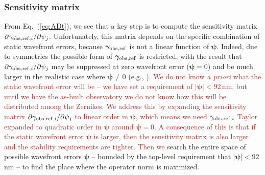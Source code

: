 \documentclass[usenatbib]{mnras}
\newcommand{\changetext}[1]{\textcolor{brown}{#1}}
\begin{document}
\subsubsection{Sensitivity matrix}
\label{as:drift-sens}

From Eq.~(\ref{eq:ADt}), we see that a key step is to compute the
sensitivity matrix $\partial \gamma_{{\rm
obs,ref},i}/\partial\psi_j$. Unfortunately, this matrix depends on the
specific combination of static wavefront errors, because
${\boldsymbol\gamma}_{\rm obs,ref}$ is not a linear function of
${\boldsymbol\psi}$. Indeed, due to symmetries the possible form of
${\boldsymbol\gamma}_{\rm obs,ref}$ is restricted, with the result
that $\partial \gamma_{{\rm obs,ref},i}/\partial\psi_j$ may be
suppressed at zero wavefront error (${\boldsymbol\psi}=0$) and be much
larger in the realistic case where ${\boldsymbol\psi}\neq 0$ (e.g., 
\citealt{2010SPIE.7731E..1EN}). 
\changetext{We do not know {\em a priori} what the static wavefront error will be -- we have set a requirement of $|{\boldsymbol\psi}|<92\,$nm, but until we have the as-built observatory we do not know how this will be distributed among the Zernikes. We address this by expanding the sensitivity matrix $\partial \gamma_{{\rm obs,ref},i}/\partial\psi_j$ to linear order in ${\boldsymbol\psi}$, which means we need $\gamma_{{\rm obs,ref},i}$ Taylor expanded to quadratic order in ${\boldsymbol\psi}$ around ${\boldsymbol\psi}=0$. A consequence of this is that if the static wavefront error ${\boldsymbol\psi}$ is larger, then the sensitivity matrix is also larger and the stability requirements are tighter.
Then we} search the
entire space of possible wavefront errors ${\boldsymbol\psi}$ --
bounded by the top-level requirement that $|{\boldsymbol\psi}|<92\,$nm
-- to find the place where the operator norm is maximized.
\end{document}
